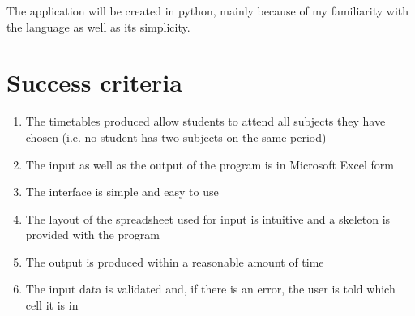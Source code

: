 \documentclass[a4paper, 12pt]{article}
\begin{document}
The application will be created in python, mainly because of my familiarity with the
language as well as its simplicity.

\section{Success criteria}

\begin{enumerate}
    \item The timetables produced allow students to attend all subjects they have chosen
        (i.e. no student has two subjects on the same period)
    \item The input as well as the output of the program is in Microsoft Excel form                  
    \item The interface is simple and easy to use
    \item The layout of the spreadsheet used for input is intuitive and a skeleton is
        provided with the program
    \item The output is produced within a reasonable amount of time
    \item The input data is validated and, if there is an error, the user is told which cell it is in
\end{enumerate}
\end{document}
